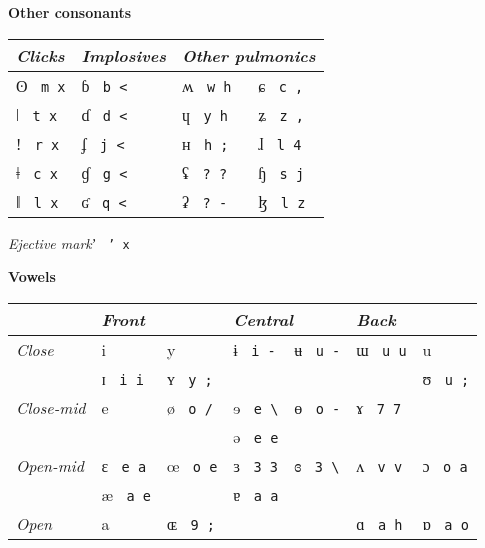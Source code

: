 \documentclass{article}
\newcommand{\seq}[1]{\ \texttt{{\color{purple}#1}}}
\begin{document}
\begin{minipage}[t]{7cm}
\textbf{Other consonants\phantom{pg}}
\vspace{0.7em}
\par
\begin{tabular}{|llll|}
  \hline
  \emph{Clicks} & \emph{Implosives} & \multicolumn{2}{l|}{\emph{Other pulmonics}}\\
  \hline
  ʘ \seq{m x} & ɓ \seq{b <} & ʍ \seq{w h} & ɕ \seq{c ,} \\
  ǀ \seq{t x} & ɗ \seq{d <} & ɥ \seq{y h} & ʑ \seq{z ,} \\
  ǃ \seq{r x} & ʄ \seq{j <} & ʜ \seq{h ;} & ɺ \seq{l 4} \\
  ǂ \seq{c x} & ɠ \seq{g <} & ʢ \seq{? ?} & ɧ \seq{s j} \\
  ǁ \seq{l x} & ʛ \seq{q <} & ʡ \seq{? -} & ɮ \seq{l z} \\
  \hline
\end{tabular}
\vspace{0.7em}
\par
\emph{Ejective mark}\quad ʼ \seq{' x}

\end{minipage}
\begin{minipage}[t]{11cm}
\textbf{Vowels\phantom{pg}}
\vspace{0.7em}
\par
\begin{tabular}{|lllllll|}
  \hline
  & \multicolumn{2}{l}{\emph{Front}} & \multicolumn{2}{l}{\emph{Central}} & \multicolumn{2}{l|}{\emph{Back}} \\
  \hline
  \emph{Close} & i & y & ɨ \seq{i -} & ʉ \seq{u -} & ɯ \seq{u u} & u \\
  & ɪ \seq{i i} & ʏ \seq{y ;} & & & & ʊ \seq{u ;} \\
  \emph{Close-mid} & e & ø \seq{o /} & ɘ \seq{e \textbackslash} & ɵ \seq{o -} & ɤ \seq{7 7} & \\
  & & & ə \seq{e e} & & & \\
  \emph{Open-mid} & ɛ \seq{e a} & œ \seq{o e} & ɜ \seq{3 3} & ɞ \seq{3 \textbackslash} & ʌ \seq{v v} & ɔ \seq{o a} \\
  & æ \seq{a e} & & ɐ \seq{a a} & & & \\
  \emph{Open} & a & ɶ \seq{9 ;} & & & ɑ \seq{a h} & ɒ \seq{a o} \\
  \hline
\end{tabular}
\end{minipage}
\end{document}
